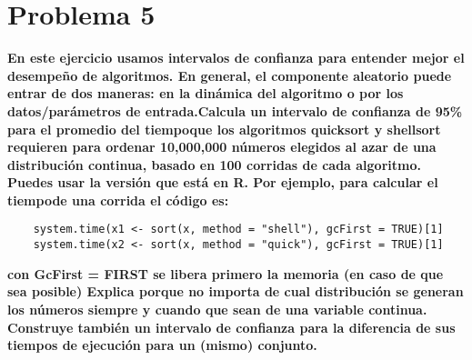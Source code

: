 \section*{Problema 5}

\textbf{En este ejercicio usamos intervalos de confianza para entender mejor el desempeño de algoritmos. En general, el componente aleatorio puede entrar de dos maneras: en la dinámica del algoritmo o por los datos/parámetros de entrada.Calcula un intervalo de confianza de 95\% para el promedio del tiempoque los algoritmos quicksort y shellsort requieren para ordenar 10,000,000 números elegidos al azar de una distribución continua, basado en 100 corridas de cada algoritmo. Puedes usar la versión que está en R. Por ejemplo, para calcular el tiempode una corrida el código es:}

\begin{verbatim}
    system.time(x1 <- sort(x, method = "shell"), gcFirst = TRUE)[1]
    system.time(x2 <- sort(x, method = "quick"), gcFirst = TRUE)[1]
\end{verbatim}

\textbf{con GcFirst = FIRST se libera primero la memoria (en caso de que sea
    posible) Explica porque no importa de cual distribución se generan los números siempre y cuando que sean de una variable continua. Construye también un intervalo de confianza para la diferencia de sus tiempos de ejecución para un (mismo) conjunto.}
